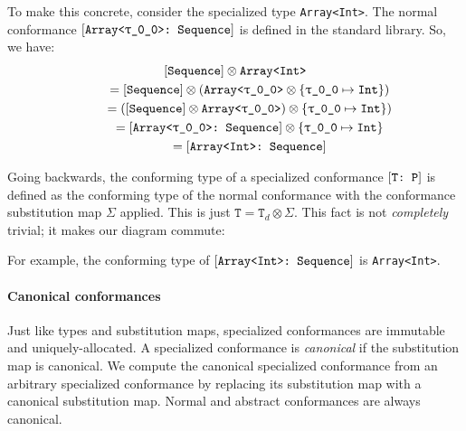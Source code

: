 \documentclass[../generics]{subfiles}
\begin{document}
To make this concrete, consider the specialized type \texttt{Array<Int>}. The normal conformance $[\texttt{Array<\texttt{$\uptau$\_0\_0}>:~Sequence}]$ is defined in the standard library. So, we have:
\begin{gather*}
[\texttt{Sequence}]\otimes\texttt{Array<Int>}\\
\qquad {} = [\texttt{Sequence}]\otimes(\texttt{Array<\texttt{$\uptau$\_0\_0}>}\otimes\{\texttt{\texttt{$\uptau$\_0\_0}} \mapsto \texttt{Int}\})\\
\qquad {} = ([\texttt{Sequence}]\otimes\texttt{Array<\texttt{$\uptau$\_0\_0}>})\otimes\{\texttt{\texttt{$\uptau$\_0\_0}} \mapsto \texttt{Int}\})\\
\qquad {} = [\texttt{Array<\texttt{$\uptau$\_0\_0}>:~Sequence}]\otimes\{\texttt{\texttt{$\uptau$\_0\_0}} \mapsto \texttt{Int}\}\\
\qquad {} = [\texttt{Array<Int>:~Sequence}]
\end{gather*}

Going backwards, the conforming type of a specialized conformance $[\texttt{T:~P}]$ is defined as the conforming type of the normal conformance with the conformance substitution map $\Sigma$ applied. This is just $\texttt{T}=\texttt{T}_d\otimes\Sigma$. This fact is not \emph{completely} trivial; it makes our diagram commute:
\begin{quote}
\end{quote}
For example, the conforming type of $[\texttt{Array<Int>:~Sequence}]$ is \texttt{Array<Int>}.

\paragraph{Canonical conformances}
Just like types and substitution maps, specialized conformances are immutable and uniquely-allocated. A specialized conformance is \emph{canonical} if the substitution map is canonical. We compute the canonical specialized conformance from an arbitrary specialized conformance by replacing its substitution map with a canonical substitution map. Normal and abstract conformances are always canonical.
\end{document}
